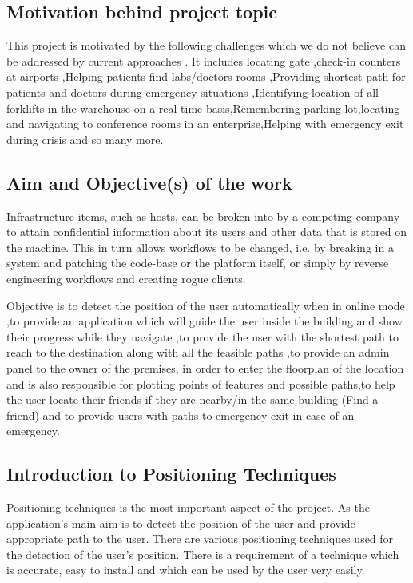 ﻿\documentclass[a4paper, 12pt]{article}
\begin{document}
\subsection{Motivation behind project topic} 
\par
This project is motivated by the following challenges which we do not believe can be addressed by current approaches . It includes locating gate ,check-in counters at airports ,Helping patients find labs/doctors rooms ,Providing shortest path for patients and doctors during emergency situations ,Identifying location of all forklifts in the warehouse on a real-time basis,Remembering parking lot,locating and navigating to conference rooms in an enterprise,Helping with emergency exit during crisis and so many more.
\\
\subsection{Aim and Objective(s) of the work} 
\par Infrastructure items, such as hosts, can be broken into by a competing company to attain confidential information about its users and other data that is stored on the machine. This in turn allows workflows to be changed, i.e. by breaking in a system and patching the code-base or the platform itself, or simply by reverse engineering workflows and creating rogue clients.
\\
\par
Objective is to detect the position of the user automatically when in online mode ,to provide an application which will guide the user inside the building and show their progress while they navigate ,to provide the user with the shortest path to reach to the destination along with all the feasible paths ,to provide an admin panel to the owner of the premises, in order to enter the floorplan of the location and is also responsible for plotting points of features and possible paths,to help the user locate their friends if they are nearby/in the same building (Find a friend) and to provide users with paths to emergency exit in case of an emergency.
\\
\subsection{Introduction to Positioning Techniques	}
\par 
Positioning techniques is the most important aspect of the project. As the application’s main aim is to detect the position of the user and provide appropriate path to the user. There are various positioning techniques used for the detection of the user’s position. There is a requirement of a technique which is accurate, easy to install and which can be used by the user very easily.
\\
\newpage
\end{document}
